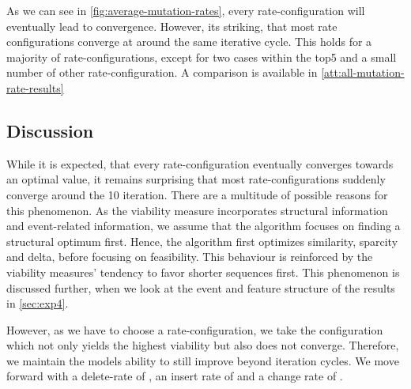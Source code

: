 \documentclass[./../../paper.tex]{subfiles}
\begin{document}
\noindent As we can see in \autoref{fig:average-mutation-rates}, every rate-configuration will eventually lead to convergence. However, its striking, that most rate configurations converge at around the same iterative cycle. This holds for a majority of rate-configurations, except for two cases within the top5 and a small number of other rate-configuration. A comparison is available in \autoref{att:all-mutation-rate-results}  


\subsection{Discussion}
While it is expected, that every rate-configuration eventually converges towards an optimal value, it remains surprising that most rate-configurations suddenly converge around the 10 iteration. There are a multitude of possible reasons for this phenomenon. As the viability measure incorporates structural information and event-related information, we assume that the algorithm focuses on finding a structural optimum first. Hence, the algorithm first optimizes similarity, sparcity and delta, before focusing on feasibility. This behaviour is reinforced by the viability measures' tendency to favor shorter sequences first. This phenomenon is discussed further, when we look at the event and feature structure of the results in \autoref{sec:exp4}.


However, as we have to choose a rate-configuration, we take the configuration which not only yields the highest viability but also does not converge. Therefore, we maintain the models ability to still improve beyond  iteration cycles.
We move forward with a delete-rate of , an insert rate of  and a change rate of .
\end{document}

